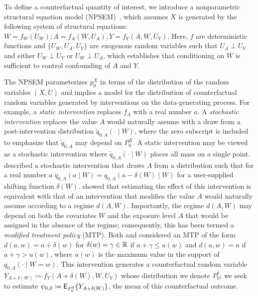 To define a counterfactual quantity of interest, we introduce a nonparametric
structural equation model (NPSEM)~\citep{pearl2000causality}, which assumes $X$
is generated by the following system of structural equations: $ W = f_W(U_W);
A = f_A(W, U_A); Y = f_Y(A, W, U_Y)$. Here, $f$ are deterministic functions and
$\{U_W, U_A, U_Y\}$ are exogenous random variables such that $U_A \perp U_Y$ and
either $U_W \perp U_Y$ or $U_W \perp U_A$, which establishes that conditioning
on $W$ is sufficient to control confounding of $A$ and $Y$.

The NPSEM parameterizes $p_0^X$ in terms of the distribution of the random
variables $(X, U)$ and implies a model for the distribution of counterfactual
random variables generated by interventions on the data-generating process. For
example, a \textit{static intervention} replaces $f_A$ with a real number $a$.
A \textit{stochastic intervention} replaces the value $A$ would naturally assume
with a draw from a post-intervention distribution $\tilde{q}_{0,A}(\cdot \mid
W)$, where the zero subscript is included to emphasize that $\tilde{q}_{0,A}$
may depend on $P_0^X$. A static intervention may be viewed as a stochastic
intervention where $\tilde{q}_{0,A}(\cdot \mid W)$ places all mass on a single
point. \citet{diaz2012population} described a stochastic intervention that draws
$A$ from a distribution such that for a real number $a$ $\tilde{q}_{0,A}(a \mid
W) = q_{0,A}(a - \delta(W) \mid W)$ for a user-supplied shifting function
$\delta(W)$. \citet{haneuse2013estimation} showed that estimating the effect of
this intervention is equivalent with that of an intervention that modifies the
value $A$ would naturally assume according to a regime $d(A,W)$. Importantly,
the regime $d(A,W)$ may depend on both the covariates $W$ and the exposure level
$A$ that would be assigned in the absence of the regime; consequently, this has
been termed a \textit{modified treatment policy} (MTP). Both
\citet{haneuse2013estimation} and \citet{diaz2018stochastic} considered an MTP
of the form $d(a,w) = a + \delta(w)$ for $\delta(w) = \gamma \in \mathbb{R}$ if $a
+ \gamma \leq u(w)$ and $d(a,w) = a$ if $a + \gamma > u(w)$, where $u(w)$ is the
maximum value in the support of $q_{0,A}(\cdot \mid W = w)$. This intervention
generates a counterfactual random variable $Y_{A + \delta(W)} \coloneqq f_Y(A
+ \delta(W), W, U_Y)$ whose distribution we denote $P_0^{\delta}$; we seek to
estimate $\psi_{0, \delta} \coloneqq \mathsf{E}_{P_0^{\delta}} \{ Y_{A + \delta(W)} \}$,
the mean of this counterfactual outcome.

